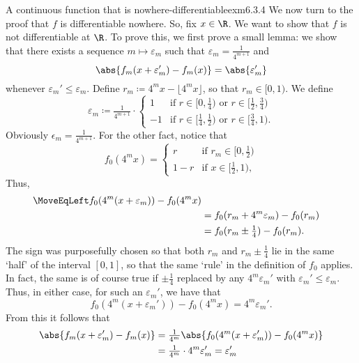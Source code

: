 \begin{exm}{A continuous function that is nowhere-differentiable}{exm6.3.4}
We now turn to the proof that $f$ is differentiable nowhere.  So, fix $x\in \R$.  We want to show that $f$ is not differentiable at $\R$.  To prove this, we first prove a small lemma:  we show that there exists a sequence $m\mapsto \varepsilon _m$ such that $\varepsilon _m=\frac{1}{4^{m+1}}$ and
\begin{equation}
\abs{f_m(x+\varepsilon _m')-f_m(x)}=\abs{\varepsilon _m'}
\end{equation}
whenever $\varepsilon _m'\leq \varepsilon _m$.  Define $r_m\coloneqq 4^mx-\lfloor 4^mx\rfloor$, so that $r_m\in [0,1)$.  We define
\begin{equation}
\varepsilon _m\coloneqq \tfrac{1}{4^{m+1}}\cdot \begin{cases}1 & \text{if }r\in [0,\tfrac{1}{4})\text{ or }r\in [\tfrac{1}{2},\tfrac{3}{4}) \\ -1 & \text{if }r\in [\tfrac{1}{4},\tfrac{1}{2})\text{ or }r\in [\tfrac{3}{4},1).\end{cases}
\end{equation}
Obviously $\epsilon _m=\frac{1}{4^{m+1}}$.  For the other fact, notice that
\begin{equation}
f_0(4^mx)=\begin{cases}r & \text{if }r_m\in [0,\tfrac{1}{2}) \\ 1-r & \text{if }x\in [\tfrac{1}{2},1),\end{cases}
\end{equation}
Thus,
\begin{equation}
\begin{split}
\MoveEqLeft
f_0(4^m(x+\varepsilon _m))-f_0(4^mx) \\
& =f_0(r_m+4^m\varepsilon _m)-f_0(r_m) \\
& =f_0(r_m\pm \tfrac{1}{4})-f_0(r_m).
\end{split}
\end{equation}
The sign was purposefully chosen so that both $r_m$ and $r_m\pm \frac{1}{4}$ lie in the same `half' of the interval $[0,1]$, so that the same `rule' in the definition of $f_0$ applies.  In fact, the same is of course true if $\pm \tfrac{1}{4}$ replaced by any $4^m\varepsilon _m'$ with $\varepsilon _m'\leq \varepsilon _m$.  Thus, in either case, for such an $\varepsilon _m'$, we have that
\begin{equation}
f_0(4^m(x+\varepsilon _m'))-f_0(4^mx)=4^m\varepsilon _m'.
\end{equation}
From this it follows that
\begin{equation*}
\begin{split}
\abs{f_m(x+\varepsilon _m')-f_m(x)} & =\tfrac{1}{4^m}\abs{f_0(4^m(x+\varepsilon _m'))-f_0(4^mx)} \\
& =\tfrac{1}{4^m}\cdot 4^m\varepsilon _m'=\varepsilon _m'
\end{split}
\end{equation*}


\end{exm}
